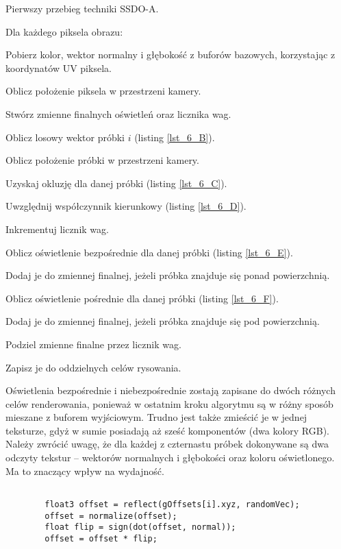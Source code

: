		\begin{algorithm}[H]
			\label{alg_6_A}
			\caption{Pierwszy przebieg techniki SSDO-A.}	
			Dla każdego piksela obrazu:
			
			\Indp
			
			Pobierz kolor, wektor normalny i głębokość z buforów bazowych, korzystając z koordynatów UV piksela.
			
			Oblicz położenie piksela w przestrzeni kamery.
			
			Stwórz zmienne finalnych oświetleń oraz licznika wag.
			
			{
				Oblicz losowy wektor próbki \(i\) (listing \ref{lst_6_B}).
				
				Oblicz położenie próbki w przestrzeni kamery.
				
				Uzyskaj okluzję dla danej próbki (listing \ref{lst_6_C}).
				
				Uwzględnij współczynnik kierunkowy (listing \ref{lst_6_D}).
				
				Inkrementuj licznik wag.
				
				Oblicz oświetlenie bezpośrednie dla danej próbki (listing \ref{lst_6_E}).
				
				Dodaj je do zmiennej finalnej, jeżeli próbka znajduje się ponad powierzchnią.
				
				Oblicz oświetlenie pośrednie dla danej próbki (listing \ref{lst_6_F}).
				
				Dodaj je do zmiennej finalnej, jeżeli próbka znajduje się pod powierzchnią.
			}
		
			Podziel zmienne finalne przez licznik wag.
			
			Zapisz je do oddzielnych celów rysowania.
			
			\Indm
		\end{algorithm}
		\flushbottom
		Oświetlenia bezpośrednie i niebezpośrednie zostają zapisane do dwóch różnych celów renderowania, ponieważ w ostatnim kroku algorytmu są w różny sposób mieszane z buforem wyjściowym. Trudno jest także zmieścić je w jednej teksturze, gdyż w sumie posiadają aż sześć komponentów (dwa kolory RGB).
		Należy zwrócić uwagę, że dla każdej z czternastu próbek dokonywane są dwa odczyty tekstur -- wektorów normalnych i głębokości oraz koloru oświetlonego. Ma to znaczący wpływ na wydajność.
		
		\begin{lstlisting}[language=HLSL,caption={Obliczenie losowego wektora próbki.},label={lst_6_B}]
		
		float3 offset = reflect(gOffsets[i].xyz, randomVec);
		offset = normalize(offset);
		float flip = sign(dot(offset, normal));
		offset = offset * flip;
		
		\end{lstlisting}
		
